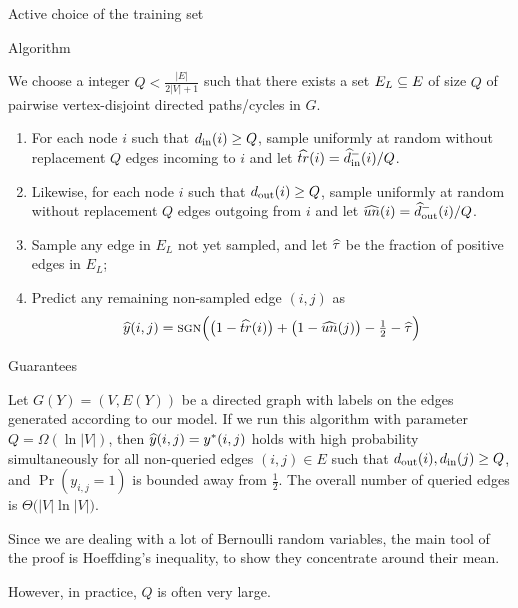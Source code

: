 \documentclass[svgnames,ignorenonframetext,final]{beamer}
\providecommand{\tightlist}{%
  \setlength{\itemsep}{0pt}\setlength{\parskip}{0pt}}
\begin{document}
\begin{frame}{Active choice of the training set}

\begin{block}{Algorithm}

We choose a integer \(Q < \tfrac{|E|}{2|V|+1}\) such that there
exists a set \(E_L \ss E\) of size \(Q\) of pairwise vertex-disjoint
directed paths/cycles in \(G\).


\begin{enumerate}
\def\labelenumi{\arabic{enumi}.}
\tightlist
\item
  For each node \(i\) such that \(\din(i) \geq Q\), sample uniformly at
  random without replacement \(Q\) edges incoming to \(i\) and let
  \(\htr(i) = \hdin^-(i)/Q\).
\item
  Likewise, for each node \(i\) such that \(\dout(i) \geq Q\), sample
  uniformly at random without replacement \(Q\) edges outgoing from
  \(i\) and let \(\hun(i) = \hdout^-(i)/Q\).
\item
  Sample any edge in \(E_L\) not yet sampled, and let \(\tauhat\) be the
  fraction of positive edges in \(E_L\);
\item
  Predict any remaining non-sampled edge \((i,j)\) as
  \[\yhat(i,j)=\sgn\Big(\big(1-\htr(i)\big) + \big(1-\hun(j)\big) - \tfrac{1}{2} -\tauhat\Big)\]
\end{enumerate}

\end{block}

\end{frame}

\begin{frame}
\begin{block}{Guarantees}

\begin{theorem}\label{t:active}
Let $G(Y) = (V,E(Y))$ be a directed graph with labels on the edges generated according to our model.
If we run this algorithm with parameter $Q = \Omega(\ln|V|)$, then
$\yhat(i,j) = y^*(i,j)$ holds with high probability simultaneously for all non-queried edges $(i,j)
\in E$ such that $\dout(i),\din(j) \ge Q$, and $\Pr(y_{i,j}=1)$ is bounded away from
$\tfrac{1}{2}$.
The overall number of queried edges is $\Theta\big(|V|\ln|V|\big)$.
\end{theorem}

Since we are dealing with a lot of Bernoulli random variables, the main
tool of the proof is Hoeffding's inequality, to show they concentrate
around their mean.

However, in practice, \(Q\) is often very large.

\end{block}

\end{frame}
\end{document}
